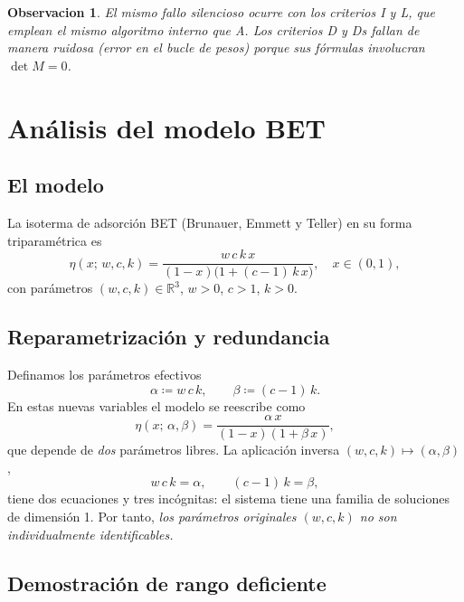 \documentclass[11pt, a4paper]{article}
\newtheorem{remark}{Observacion}
\newcommand{\R}{\mathbb{R}}
\begin{document}
\begin{remark}
El mismo fallo silencioso ocurre con los criterios I y L, que emplean el mismo algoritmo
interno que A.  Los criterios D y Ds fallan de manera ruidosa (error en el bucle de pesos)
porque sus f\'ormulas involucran $\det M = 0$.
\end{remark}

\section{An\'alisis del modelo BET}
\label{sec:bet}

\subsection{El modelo}

La isoterma de adsorci\'on BET (Brunauer, Emmett y Teller) en su forma triparamétrica es
\[
  \eta(x;\, w, c, k)
  = \frac{w\,c\,k\,x}{(1-x)\bigl(1 + (c-1)\,k\,x\bigr)},
  \quad x \in (0,1),
\]
con par\'ametros $(w, c, k) \in \R^3$, $w > 0$, $c > 1$, $k > 0$.

\subsection{Reparametrizaci\'on y redundancia}

Definamos los par\'ametros efectivos
\[
  \alpha \coloneqq w\,c\,k, \qquad \beta \coloneqq (c-1)\,k.
\]
En estas nuevas variables el modelo se reescribe como
\[
  \eta(x;\, \alpha, \beta) = \frac{\alpha\,x}{(1-x)(1 + \beta\,x)},
\]
que depende de \emph{dos} par\'ametros libres.  La aplicaci\'on inversa
$(w, c, k) \mapsto (\alpha, \beta)$,
\[
  w\,c\,k = \alpha, \qquad (c-1)\,k = \beta,
\]
tiene dos ecuaciones y tres inc\'ognitas: el sistema tiene una familia de soluciones de
dimensi\'on 1.  Por tanto, \emph{los par\'ametros originales $(w, c, k)$ no son
individualmente identificables.}

\subsection{Demostraci\'on de rango deficiente}
\end{document}

